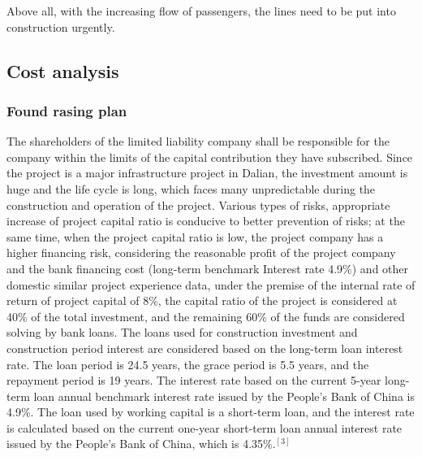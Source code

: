 \documentclass[12pt]{article}
\begin{document}
Above all, with the increasing flow of passengers, the lines need to be put into construction urgently.

\subsection{Cost analysis}
\subsubsection{Found rasing plan}
The shareholders of the limited liability company shall be responsible for the company within the limits of the capital contribution they have subscribed. Since the project is a major infrastructure project in Dalian, the investment amount is huge and the life cycle is long, which faces many unpredictable during the construction and operation of the project. Various types of risks, appropriate increase of project capital ratio is conducive to better prevention of risks; at the same time, when the project capital ratio is low, the project company has a higher financing risk, considering the reasonable profit of the project company and the bank financing cost (long-term benchmark Interest rate 4.9\%) and other domestic similar project experience data, under the premise of the internal rate of return of project capital of 8\%, the capital ratio of the project is considered at 40\% of the total investment, and the remaining 60\% of the funds are considered solving by bank loans. The loans used for construction investment and construction period interest are considered based on the long-term loan interest rate. The loan period is 24.5 years, the grace period is 5.5 years, and the repayment period is 19 years. The interest rate based on the current 5-year long-term loan annual benchmark interest rate issued by the People’s Bank of China is 4.9\%. The loan used by working capital is a short-term loan, and the interest rate is calculated based on the current one-year short-term loan annual interest rate issued by the People's Bank of China, which is 4.35\%.$^{[3]}$
\end{document}
